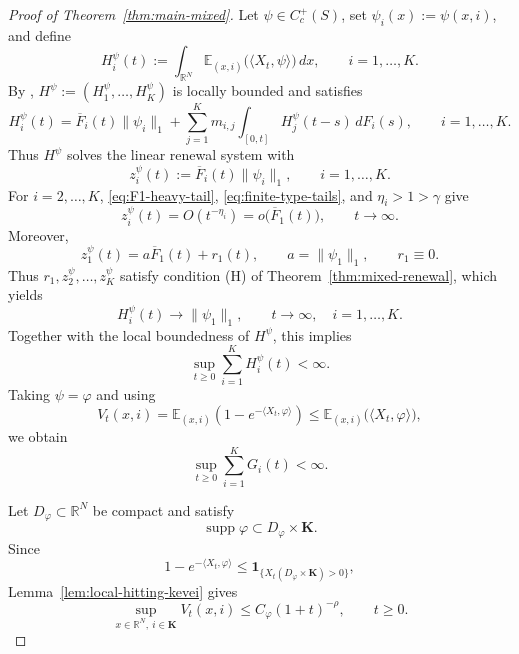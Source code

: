 \documentclass[reqno,final,11pt]{amsart}
\newcommand{\R}{\mathbb R}
\newcommand{\E}{\mathbb E}
\newcommand{\Kk}{\mathbf K}
\newcommand{\ind}[1]{\mathbf 1_{\{#1\}}}
\newcommand{\ip}[2]{\langle #1,#2\rangle}
\theoremstyle{plain}
\theoremstyle{definition}
\theoremstyle{remark}
\numberwithin{equation}{section}
\begin{document}
\begin{proof}[Proof of Theorem~\ref{thm:main-mixed}]
Let \(\psi\in C_c^+(S)\), set \(\psi_i(x):=\psi(x,i)\), and define
\[
  H_i^\psi(t):=\int_{\R^N}\E_{(x,i)}\bigl(\ip{X_t}{\psi}\bigr)\,dx,
  \qquad i=1,\dots,K.
\]
By \cite[Proposition~2.1(a)]{KLRFiniteMean}, \(H^\psi:=(H_1^\psi,\dots,H_K^\psi)\) is locally bounded and satisfies
\begin{equation}\label{eq:first-moment-mixed}
  H_i^\psi(t)
  =
  \overline F_i(t)\|\psi_i\|_1
  +\sum_{j=1}^K m_{i,j}\int_{[0,t]}H_j^\psi(t-s)\,dF_i(s),
  \qquad i=1,\dots,K.
\end{equation}
Thus \(H^\psi\) solves the linear renewal system with
\[
  z_i^\psi(t):=\overline F_i(t)\|\psi_i\|_1,
  \qquad i=1,\dots,K.
\]
For \(i=2,\dots,K\), \eqref{eq:F1-heavy-tail}, \eqref{eq:finite-type-tails}, and \(\eta_i>1>\gamma\) give
\[
  z_i^\psi(t)=O(t^{-\eta_i})=o\bigl(\overline F_1(t)\bigr),
  \qquad t\to\infty.
\]
Moreover,
\[
  z_1^\psi(t)=a\overline F_1(t)+r_1(t),
  \qquad
  a=\|\psi_1\|_1,
  \qquad
  r_1\equiv0.
\]
Thus \(r_1,z_2^\psi,\dots,z_K^\psi\) satisfy condition \textup{(H)} of Theorem~\ref{thm:mixed-renewal}, which yields
\begin{equation}\label{eq:first-moment-limit-mixed}
  H_i^\psi(t)\longrightarrow\|\psi_1\|_1,
  \qquad t\to\infty,\quad i=1,\dots,K.
\end{equation}
Together with the local boundedness of \(H^\psi\), this implies
\begin{equation}\label{eq:first-moment-bound-mixed}
  \sup_{t\ge0}\sum_{i=1}^K H_i^\psi(t)<\infty.
\end{equation}
Taking \(\psi=\varphi\) and using
\[
  V_t(x,i)
  =
  \E_{(x,i)}\left(1-e^{-\ip{X_t}{\varphi}}\right)
  \le
  \E_{(x,i)}\bigl(\ip{X_t}{\varphi}\bigr),
\]
we obtain
\begin{equation}\label{eq:G-L1-bound}
  \sup_{t\ge0}\sum_{i=1}^K G_i(t)<\infty.
\end{equation}

Let \(D_\varphi\subset\R^N\) be compact and satisfy
\[
  \operatorname{supp}\varphi\subset D_\varphi\times\Kk.
\]
Since
\[
  1-e^{-\ip{X_t}{\varphi}}
  \le \ind{X_t(D_\varphi\times\Kk)>0},
\]
Lemma~\ref{lem:local-hitting-kevei} gives
\begin{equation}\label{eq:V-sup-bound-mixed}
  \sup_{x\in\R^N,\ i\in\Kk}V_t(x,i)
  \le C_\varphi(1+t)^{-\rho},
  \qquad t\ge0.
\end{equation}


\end{proof}
\end{document}
